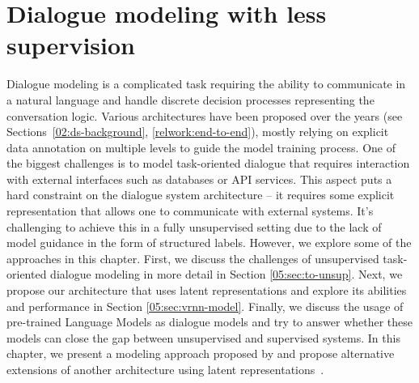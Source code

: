 \chapter{Dialogue modeling with less supervision}%
\label{chap:modeling}
Dialogue modeling is a complicated task requiring the ability to communicate in a natural language and handle discrete decision processes representing the conversation logic.
Various architectures have been proposed over the years (see Sections~\ref{02:ds-background}, \ref{relwork:end-to-end}), mostly relying on explicit data annotation on multiple levels to guide the model training process.
One of the biggest challenges is to model task-oriented dialogue that requires interaction with external interfaces such as databases or API services.
This aspect puts a hard constraint on the dialogue system architecture -- it requires some explicit representation that allows one to communicate with external systems.
It's challenging to achieve this in a fully unsupervised setting due to the lack of model guidance in the form of structured labels.
However, we explore some of the approaches in this chapter.
First, we discuss the challenges of unsupervised task-oriented dialogue modeling in more detail in Section \ref{05:sec:to-unsup}.
Next, we propose our architecture that uses latent representations and explore its abilities and performance in Section \ref{05:sec:vrnn-model}.
Finally, we discuss the usage of pre-trained Language Models as dialogue models and try to answer whether these models can close the gap between unsupervised and supervised systems.
In this chapter, we present a modeling approach proposed by \citet{hudecek-dusek-2022-learning} and propose alternative extensions of another architecture using latent representations~\citep{lubis-etal-2022-dialogue}. 

